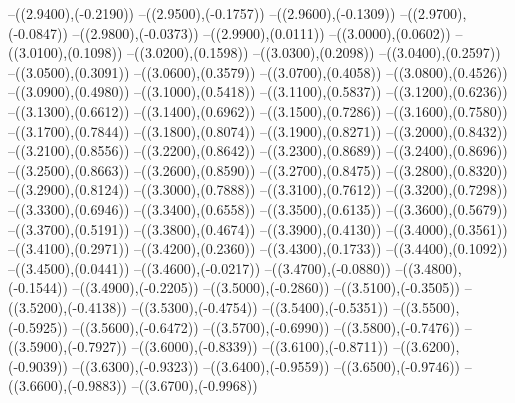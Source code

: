 {	--({\sx*(2.9400)},{\sy*(-0.2190)})
	--({\sx*(2.9500)},{\sy*(-0.1757)})
	--({\sx*(2.9600)},{\sy*(-0.1309)})
	--({\sx*(2.9700)},{\sy*(-0.0847)})
	--({\sx*(2.9800)},{\sy*(-0.0373)})
	--({\sx*(2.9900)},{\sy*(0.0111)})
	--({\sx*(3.0000)},{\sy*(0.0602)})
	--({\sx*(3.0100)},{\sy*(0.1098)})
	--({\sx*(3.0200)},{\sy*(0.1598)})
	--({\sx*(3.0300)},{\sy*(0.2098)})
	--({\sx*(3.0400)},{\sy*(0.2597)})
	--({\sx*(3.0500)},{\sy*(0.3091)})
	--({\sx*(3.0600)},{\sy*(0.3579)})
	--({\sx*(3.0700)},{\sy*(0.4058)})
	--({\sx*(3.0800)},{\sy*(0.4526)})
	--({\sx*(3.0900)},{\sy*(0.4980)})
	--({\sx*(3.1000)},{\sy*(0.5418)})
	--({\sx*(3.1100)},{\sy*(0.5837)})
	--({\sx*(3.1200)},{\sy*(0.6236)})
	--({\sx*(3.1300)},{\sy*(0.6612)})
	--({\sx*(3.1400)},{\sy*(0.6962)})
	--({\sx*(3.1500)},{\sy*(0.7286)})
	--({\sx*(3.1600)},{\sy*(0.7580)})
	--({\sx*(3.1700)},{\sy*(0.7844)})
	--({\sx*(3.1800)},{\sy*(0.8074)})
	--({\sx*(3.1900)},{\sy*(0.8271)})
	--({\sx*(3.2000)},{\sy*(0.8432)})
	--({\sx*(3.2100)},{\sy*(0.8556)})
	--({\sx*(3.2200)},{\sy*(0.8642)})
	--({\sx*(3.2300)},{\sy*(0.8689)})
	--({\sx*(3.2400)},{\sy*(0.8696)})
	--({\sx*(3.2500)},{\sy*(0.8663)})
	--({\sx*(3.2600)},{\sy*(0.8590)})
	--({\sx*(3.2700)},{\sy*(0.8475)})
	--({\sx*(3.2800)},{\sy*(0.8320)})
	--({\sx*(3.2900)},{\sy*(0.8124)})
	--({\sx*(3.3000)},{\sy*(0.7888)})
	--({\sx*(3.3100)},{\sy*(0.7612)})
	--({\sx*(3.3200)},{\sy*(0.7298)})
	--({\sx*(3.3300)},{\sy*(0.6946)})
	--({\sx*(3.3400)},{\sy*(0.6558)})
	--({\sx*(3.3500)},{\sy*(0.6135)})
	--({\sx*(3.3600)},{\sy*(0.5679)})
	--({\sx*(3.3700)},{\sy*(0.5191)})
	--({\sx*(3.3800)},{\sy*(0.4674)})
	--({\sx*(3.3900)},{\sy*(0.4130)})
	--({\sx*(3.4000)},{\sy*(0.3561)})
	--({\sx*(3.4100)},{\sy*(0.2971)})
	--({\sx*(3.4200)},{\sy*(0.2360)})
	--({\sx*(3.4300)},{\sy*(0.1733)})
	--({\sx*(3.4400)},{\sy*(0.1092)})
	--({\sx*(3.4500)},{\sy*(0.0441)})
	--({\sx*(3.4600)},{\sy*(-0.0217)})
	--({\sx*(3.4700)},{\sy*(-0.0880)})
	--({\sx*(3.4800)},{\sy*(-0.1544)})
	--({\sx*(3.4900)},{\sy*(-0.2205)})
	--({\sx*(3.5000)},{\sy*(-0.2860)})
	--({\sx*(3.5100)},{\sy*(-0.3505)})
	--({\sx*(3.5200)},{\sy*(-0.4138)})
	--({\sx*(3.5300)},{\sy*(-0.4754)})
	--({\sx*(3.5400)},{\sy*(-0.5351)})
	--({\sx*(3.5500)},{\sy*(-0.5925)})
	--({\sx*(3.5600)},{\sy*(-0.6472)})
	--({\sx*(3.5700)},{\sy*(-0.6990)})
	--({\sx*(3.5800)},{\sy*(-0.7476)})
	--({\sx*(3.5900)},{\sy*(-0.7927)})
	--({\sx*(3.6000)},{\sy*(-0.8339)})
	--({\sx*(3.6100)},{\sy*(-0.8711)})
	--({\sx*(3.6200)},{\sy*(-0.9039)})
	--({\sx*(3.6300)},{\sy*(-0.9323)})
	--({\sx*(3.6400)},{\sy*(-0.9559)})
	--({\sx*(3.6500)},{\sy*(-0.9746)})
	--({\sx*(3.6600)},{\sy*(-0.9883)})
	--({\sx*(3.6700)},{\sy*(-0.9968)})
}
